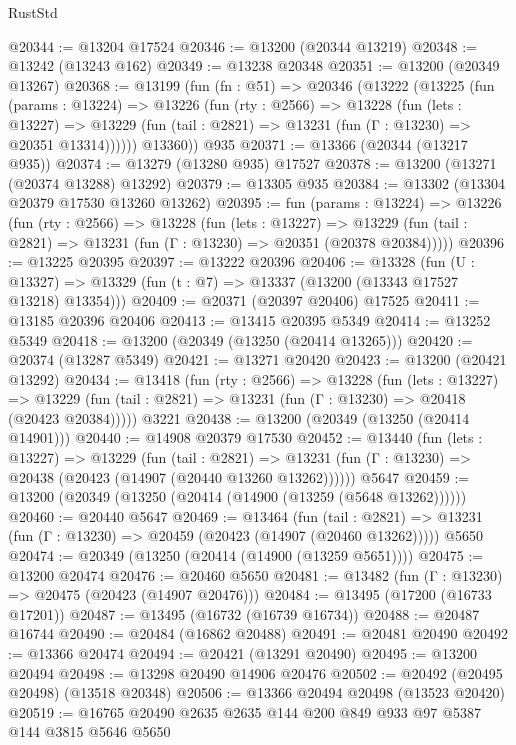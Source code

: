 \begin{lexlean}{RustStd}
\begin{coremodule}
@20344 := @13204 @17524
@20346 := @13200 (@20344 @13219)
@20348 := @13242 (@13243 @162)
@20349 := @13238 @20348
@20351 := @13200 (@20349 @13267)
@20368 := @13199
    (fun (fn : @51) =>
    @20346
      (@13222
        (@13225
          (fun (params : @13224) =>
          @13226
            (fun (rty : @2566) =>
            @13228
              (fun (lets : @13227) =>
              @13229 (fun (tail : @2821) => @13231 (fun (Γ : @13230) => @20351 @13314))))))
        @13360))
    @935
@20371 := @13366 (@20344 (@13217 @935))
@20374 := @13279 (@13280 @935) @17527
@20378 := @13200 (@13271 (@20374 @13288) @13292)
@20379 := @13305 @935
@20384 := @13302 (@13304 @20379 @17530 @13260 @13262)
@20395 := fun (params : @13224) =>
  @13226
    (fun (rty : @2566) =>
    @13228
      (fun (lets : @13227) =>
      @13229 (fun (tail : @2821) => @13231 (fun (Γ : @13230) => @20351 (@20378 @20384)))))
@20396 := @13225 @20395
@20397 := @13222 @20396
@20406 := @13328
    (fun (U : @13327) => @13329 (fun (t : @7) => @13337 (@13200 (@13343 @17527 @13218) @13354)))
@20409 := @20371 (@20397 @20406) @17525
@20411 := @13185 @20396 @20406
@20413 := @13415 @20395 @5349
@20414 := @13252 @5349
@20418 := @13200 (@20349 (@13250 (@20414 @13265)))
@20420 := @20374 (@13287 @5349)
@20421 := @13271 @20420
@20423 := @13200 (@20421 @13292)
@20434 := @13418
    (fun (rty : @2566) =>
    @13228
      (fun (lets : @13227) =>
      @13229 (fun (tail : @2821) => @13231 (fun (Γ : @13230) => @20418 (@20423 @20384)))))
    @3221
@20438 := @13200 (@20349 (@13250 (@20414 @14901)))
@20440 := @14908 @20379 @17530
@20452 := @13440
    (fun (lets : @13227) =>
    @13229
      (fun (tail : @2821) =>
      @13231 (fun (Γ : @13230) => @20438 (@20423 (@14907 (@20440 @13260 @13262))))))
    @5647
@20459 := @13200 (@20349 (@13250 (@20414 (@14900 (@13259 (@5648 @13262))))))
@20460 := @20440 @5647
@20469 := @13464
    (fun (tail : @2821) => @13231 (fun (Γ : @13230) => @20459 (@20423 (@14907 (@20460 @13262)))))
    @5650
@20474 := @20349 (@13250 (@20414 (@14900 (@13259 @5651))))
@20475 := @13200 @20474
@20476 := @20460 @5650
@20481 := @13482 (fun (Γ : @13230) => @20475 (@20423 (@14907 @20476)))
@20484 := @13495 (@17200 (@16733 @17201))
@20487 := @13495 (@16732 (@16739 @16734))
@20488 := @20487 @16744
@20490 := @20484 (@16862 @20488)
@20491 := @20481 @20490
@20492 := @13366 @20474
@20494 := @20421 (@13291 @20490)
@20495 := @13200 @20494
@20498 := @13298 @20490 @14906 @20476
@20502 := @20492 (@20495 @20498) (@13518 @20348)
@20506 := @13366 @20494 @20498 (@13523 @20420)
@20519 := @16765 @20490 @2635 @2635 @144 @200 @849 @933 @97 @5387 @144 @3815 @5646 @5650

\end{coremodule}
\end{lexlean}
